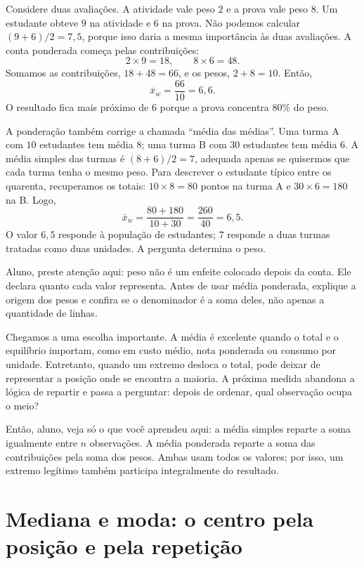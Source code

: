 Considere duas avaliações. A atividade vale peso $2$ e a prova vale peso $8$. Um estudante obteve $9$ na atividade e $6$ na prova. Não podemos calcular $(9+6)/2=7{,}5$, porque isso daria a mesma importância às duas avaliações. A conta ponderada começa pelas contribuições:
\[
2\times9=18,\qquad 8\times6=48.
\]
Somamos as contribuições, $18+48=66$, e os pesos, $2+8=10$. Então,
\[
\bar{x}_w=\frac{66}{10}=6{,}6.
\]
O resultado fica mais próximo de $6$ porque a prova concentra $80\%$ do peso.

A ponderação também corrige a chamada ``média das médias''. Uma turma A com $10$ estudantes tem média $8$; uma turma B com $30$ estudantes tem média $6$. A média simples das turmas é $(8+6)/2=7$, adequada apenas se quisermos que cada turma tenha o mesmo peso. Para descrever o estudante típico entre os quarenta, recuperamos os totais: $10\times8=80$ pontos na turma A e $30\times6=180$ na B. Logo,
\[
\bar{x}_w=\frac{80+180}{10+30}=\frac{260}{40}=6{,}5.
\]
O valor $6{,}5$ responde à população de estudantes; $7$ responde a duas turmas tratadas como duas unidades. A pergunta determina o peso.

\begin{GuidedBox}
Aluno, preste atenção aqui: peso não é um enfeite colocado depois da conta. Ele declara quanto cada valor representa. Antes de usar média ponderada, explique a origem dos pesos e confira se o denominador é a soma deles, não apenas a quantidade de linhas.
\end{GuidedBox}

Chegamos a uma escolha importante. A média é excelente quando o total e o equilíbrio importam, como em custo médio, nota ponderada ou consumo por unidade. Entretanto, quando um extremo desloca o total, pode deixar de representar a posição onde se encontra a maioria. A próxima medida abandona a lógica de repartir e passa a perguntar: depois de ordenar, qual observação ocupa o meio?

\begin{SummaryBox}
Então, aluno, veja só o que você aprendeu aqui: a média simples reparte a soma igualmente entre $n$ observações. A média ponderada reparte a soma das contribuições pela soma dos pesos. Ambas usam todos os valores; por isso, um extremo legítimo também participa integralmente do resultado.
\end{SummaryBox}

\section{Mediana e moda: o centro pela posição e pela repetição}

